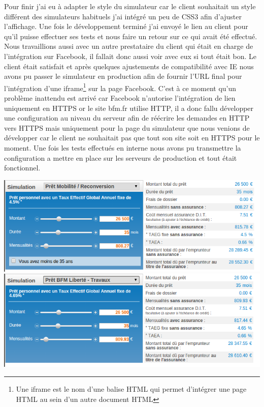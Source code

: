 \documentclass[a4paper,11pt,twoside]{report}
\begin{document}
      
      Pour finir j'ai eu à adapter le style du simulateur car le client souhaitait un style différent des simulateurs habituels j'ai intégré un peu de CSS3 afin d'ajuster l'affichage. Une fois le développement terminé j'ai envoyé le lien au client pour qu'il puisse effectuer ses tests et nous faire un retour sur ce qui avait été effectué. Nous travaillions aussi avec un autre prestataire du client qui était en charge de l'intégration sur Facebook, il fallait donc aussi voir avec eux si tout était bon. Le client était satisfait et après quelques ajustements de compatibilité avec IE nous avons pu passer le simulateur en production afin de fournir l'URL final pour l'intégration d'une iframe\footnote{Une iframe est le nom d'une balise HTML qui permet d'intégrer une page HTML au sein d'un autre document HTML} sur la page Facebook. C'est à ce moment qu'un problème inattendu est arrivé car Facebook n'autorise l'intégration de lien uniquement en HTTPS or le site bfm.fr utilise HTTP, il a donc fallu développer une configuration au niveau du serveur afin de réécrire les demandes en HTTP vers HTTPS mais uniquement pour la page du simulateur que nous venions de développer car le client ne souhaitait pas que tout son site soit en HTTPS pour le moment. Une fois les tests effectués en interne nous avons pu transmettre la configuration a mettre en place sur les serveurs de production et tout était fonctionnel.
      \label{global_loan_simulator_3}
      
      \begin{center}
	\includegraphics[width=\textwidth]{images/global_simulator1.png} 
	\includegraphics[width=\textwidth]{images/global_simulator2.png} 
	\label{global_simulator1}
      \end{center}
\end{document}
